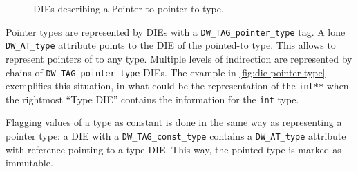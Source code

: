 \begin{figure}
  \centering
  \caption{DIEs describing a Pointer-to-pointer-to type.}
  \label{fig:die-pointer-type}
\end{figure}

Pointer types are represented by DIEs with a \verb|DW_TAG_pointer_type| tag.
A lone \verb|DW_AT_type| attribute points to the DIE of the pointed-to type.
This allows to represent pointers of to any type. Multiple levels of
indirection are represented by chains of \verb|DW_TAG_pointer_type| DIEs.
The example in \autoref{fig:die-pointer-type} exemplifies this situation, in
what could be the representation of the \texttt{int**} when the
rightmost “Type DIE” contains the information for the \texttt{int}
type.



Flagging values of a type as constant is done in the same way as representing
a pointer type: a DIE with a \verb|DW_TAG_const_type| contains
a \verb|DW_AT_type| attribute with reference pointing to a type DIE.
This way, the pointed type is marked as immutable.




